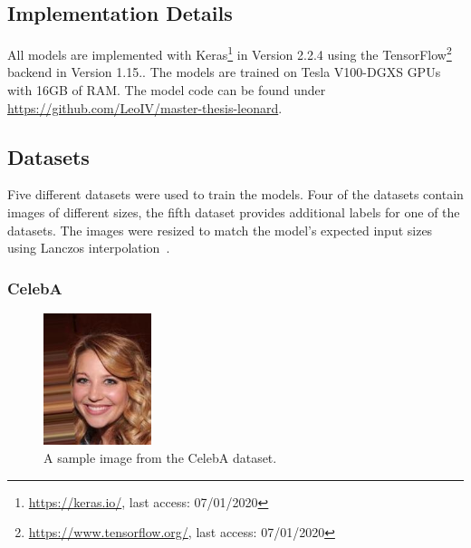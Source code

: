 \subsection{Implementation Details}\label{subsec:implementation-details}

All models are implemented with Keras\footnote{\href{https://keras.io/}{https://keras.io/}, last access: 07/01/2020} in Version 2.2.4 using the TensorFlow\footnote{\href{https://www.tensorflow.org/}{https://www.tensorflow.org/}, last access: 07/01/2020} backend in Version 1.15..
The models are trained on Tesla V100-DGXS GPUs with 16GB of RAM.
The model code can be found under \href{https://github.com/LeoIV/master-thesis-leonard}{https://github.com/LeoIV/master-thesis-leonard}.

\subsection{Datasets}\label{subsec:datasets}

Five different datasets were used to train the models.
Four of the datasets contain images of different sizes, the fifth dataset provides additional labels for one of the datasets.
The images were resized to match the model's expected input sizes using Lanczos interpolation~\citep[pp. 223, ff]{burger2009principles}.

\subsubsection{CelebA}\label{subsubsec:celeba_dataset}

\begin{figure}
    \begin{center}
        \includegraphics[width=0.28\textwidth]{images/celeba_sample_63.jpg}
    \end{center}
    \caption[CelebA dataset sample image]{A sample image from the CelebA dataset.}
    \label{fig:celeba_sample}
\end{figure}

